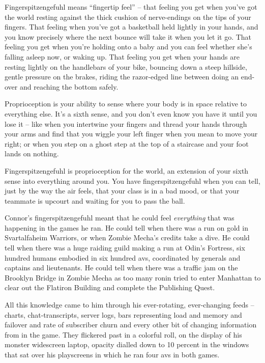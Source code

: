 Fingerspitzengefuhl means ``fingertip feel'' -- that feeling you get
when you've got the world resting against the thick cushion of
nerve-endings on the tips of your fingers. That feeling when you've
got a basketball held lightly in your hands, and you know precisely
where the next bounce will take it when you let it go. That feeling
you get when you're holding onto a baby and you can feel whether
she's falling asleep now, or waking up. That feeling you get when
your hands are resting lightly on the handlebars of your bike,
bouncing down a steep hillside, gentle pressure on the brakes,
riding the razor-edged line between doing an end-over and reaching
the bottom safely.

Proprioception is your ability to sense where your body is in space
relative to everything else. It's a sixth sense, and you don't even
know you have it until you lose it -- like when you intertwine your
fingers and thread your hands through your arms and find that you
wiggle your left finger when you mean to move your right; or when
you step on a ghost step at the top of a staircase and your foot
lands on nothing.

Fingerspitzengefuhl is proprioception for the world, an extension
of your sixth sense into everything around you. You have
fingerspitzengefuhl when you can tell, just by the way the air
feels, that your class is in a bad mood, or that your teammate is
upcourt and waiting for you to pass the ball.

Connor's fingerspitzengefuhl meant that he could feel
\emph{everything} that was happening in the games he ran. He could
tell when there was a run on gold in Svartalfaheim Warriors, or
when Zombie Mecha's credits take a dive. He could tell when there
was a huge raiding guild making a run at Odin's Fortress, six
hundred humans embodied in six hundred avs, coordinated by generals
and captains and lieutenants. He could tell when there was a
traffic jam on the Brooklyn Bridge in Zombie Mecha as too many
ronin tried to enter Manhattan to clear out the Flatiron Building
and complete the Publishing Quest.

All this knowledge came to him through his ever-rotating,
ever-changing feeds -- charts, chat-transcripts, server logs, bars
representing load and memory and failover and rate of subscriber
churn and every other bit of changing information from in the game.
They flickered past in a colorful roll, on the display of his
monster widescreen laptop, opacity dialled down to 10 percent in
the windows that sat over his playscreens in which he ran four avs
in both games.

